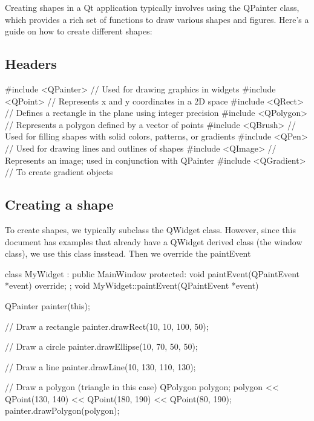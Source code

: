 \documentclass{report}
\begin{document}
    \bigbreak \noindent 
    \bigbreak \noindent 
    Creating shapes in a Qt application typically involves using the QPainter class, which provides a rich set of functions to draw various shapes and figures. Here's a guide on how to create different shapes:
    \pagebreak 
    \subsection{Headers}
    \bigbreak \noindent 
    \begin{cppcode}
        #include <QPainter>      // Used for drawing graphics in widgets
        #include <QPoint>        // Represents x and y coordinates in a 2D space
        #include <QRect>         // Defines a rectangle in the plane using integer precision
        #include <QPolygon>      // Represents a polygon defined by a vector of points
        #include <QBrush>        // Used for filling shapes with solid colors, patterns, or gradients
        #include <QPen>          // Used for drawing lines and outlines of shapes
        #include <QImage>        // Represents an image; used in conjunction with QPainter
        #include <QGradient>     // To create gradient objects
    \end{cppcode}
    \bigbreak \noindent 
    \subsection{Creating a shape}
    \bigbreak \noindent 
    To create shapes, we typically  subclass the QWidget class. However, since this document has examples that already have a QWidget derived class (the window class), we use this class insstead. Then we override the paintEvent
    \bigbreak \noindent 
    \begin{cppcode}
class MyWidget : public MainWindow {
protected:
    void paintEvent(QPaintEvent *event) override;
};
void MyWidget::paintEvent(QPaintEvent *event) {
    QPainter painter(this);

    // Draw a rectangle
    painter.drawRect(10, 10, 100, 50);

    // Draw a circle
    painter.drawEllipse(10, 70, 50, 50);

    // Draw a line
    painter.drawLine(10, 130, 110, 130);

    // Draw a polygon (triangle in this case)
    QPolygon polygon;
    polygon << QPoint(130, 140) << QPoint(180, 190) << QPoint(80, 190);
    painter.drawPolygon(polygon);
}
    \end{cppcode}
\end{document}
